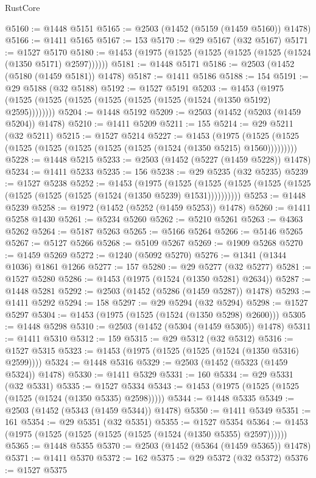 \begin{lexlean}{RustCore}
\begin{coremodule}
{\begin{coremodule}
{{{{{{{{{{{{{{{{{{{{{{{{{{{{{{{{{{{{{{{{{{{{{@5160 := @1448 @5151
@5165 := @2503 (@1452 (@5159 (@1459 @5160)) @1478)
@5166 := @1411 @5165
@5167 := 153
@5170 := @29 @5167 (@32 @5167)
@5171 := @1527 @5170
@5180 := @1453 (@1975 (@1525 (@1525 (@1525 (@1525 (@1524 (@1350 @5171) @2597))))))
@5181 := @1448 @5171
@5186 := @2503 (@1452 (@5180 (@1459 @5181)) @1478)
@5187 := @1411 @5186
@5188 := 154
@5191 := @29 @5188 (@32 @5188)
@5192 := @1527 @5191
@5203 := @1453 (@1975 (@1525 (@1525 (@1525 (@1525 (@1525 (@1525 (@1524 (@1350 @5192) @2595))))))))
@5204 := @1448 @5192
@5209 := @2503 (@1452 (@5203 (@1459 @5204)) @1478)
@5210 := @1411 @5209
@5211 := 155
@5214 := @29 @5211 (@32 @5211)
@5215 := @1527 @5214
@5227 := @1453
    (@1975 (@1525 (@1525 (@1525 (@1525 (@1525 (@1525 (@1525 (@1524 (@1350 @5215) @1560)))))))))
@5228 := @1448 @5215
@5233 := @2503 (@1452 (@5227 (@1459 @5228)) @1478)
@5234 := @1411 @5233
@5235 := 156
@5238 := @29 @5235 (@32 @5235)
@5239 := @1527 @5238
@5252 := @1453
    (@1975
      (@1525 (@1525 (@1525 (@1525 (@1525 (@1525 (@1525 (@1525 (@1524 (@1350 @5239) @1531))))))))))
@5253 := @1448 @5239
@5258 := @1972 (@1452 (@5252 (@1459 @5253)) @1478)
@5260 := @1411 @5258 @1430
@5261 := @5234 @5260
@5262 := @5210 @5261
@5263 := @4363 @5262
@5264 := @5187 @5263
@5265 := @5166 @5264
@5266 := @5146 @5265
@5267 := @5127 @5266
@5268 := @5109 @5267
@5269 := @1909 @5268
@5270 := @1459 @5269
@5272 := @1240 (@5092 @5270)
@5276 := @1341 (@1344 @1036) @1861 @1266
@5277 := 157
@5280 := @29 @5277 (@32 @5277)
@5281 := @1527 @5280
@5286 := @1453 (@1975 (@1524 (@1350 @5281) @2634))
@5287 := @1448 @5281
@5292 := @2503 (@1452 (@5286 (@1459 @5287)) @1478)
@5293 := @1411 @5292
@5294 := 158
@5297 := @29 @5294 (@32 @5294)
@5298 := @1527 @5297
@5304 := @1453 (@1975 (@1525 (@1524 (@1350 @5298) @2600)))
@5305 := @1448 @5298
@5310 := @2503 (@1452 (@5304 (@1459 @5305)) @1478)
@5311 := @1411 @5310
@5312 := 159
@5315 := @29 @5312 (@32 @5312)
@5316 := @1527 @5315
@5323 := @1453 (@1975 (@1525 (@1525 (@1524 (@1350 @5316) @2599))))
@5324 := @1448 @5316
@5329 := @2503 (@1452 (@5323 (@1459 @5324)) @1478)
@5330 := @1411 @5329
@5331 := 160
@5334 := @29 @5331 (@32 @5331)
@5335 := @1527 @5334
@5343 := @1453 (@1975 (@1525 (@1525 (@1525 (@1524 (@1350 @5335) @2598)))))
@5344 := @1448 @5335
@5349 := @2503 (@1452 (@5343 (@1459 @5344)) @1478)
@5350 := @1411 @5349
@5351 := 161
@5354 := @29 @5351 (@32 @5351)
@5355 := @1527 @5354
@5364 := @1453 (@1975 (@1525 (@1525 (@1525 (@1525 (@1524 (@1350 @5355) @2597))))))
@5365 := @1448 @5355
@5370 := @2503 (@1452 (@5364 (@1459 @5365)) @1478)
@5371 := @1411 @5370
@5372 := 162
@5375 := @29 @5372 (@32 @5372)
@5376 := @1527 @5375
}}}}}}}}}}}}}}}}}}}}}}}}}}}}}}}}}}}}}}}}}}}}}
\end{coremodule}}
\end{coremodule}
\end{lexlean}
